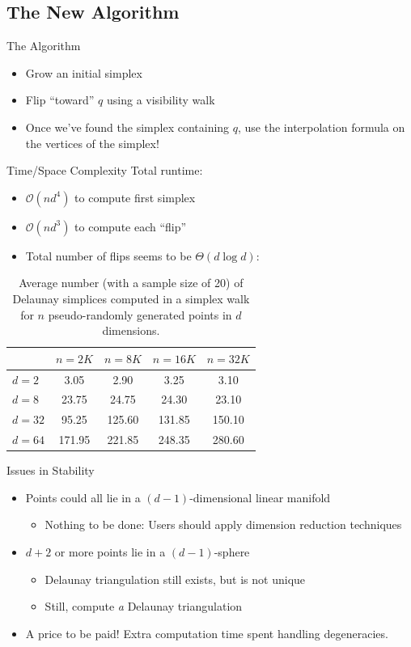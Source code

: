 \documentclass[xcolor=dvipsnames]{beamer}
\begin{document}
\subsection{The New Algorithm}
\begin{frame}{The Algorithm}
\begin{itemize}
\item Grow an initial simplex
\item Flip ``toward'' $q$ using a visibility walk
\item Once we've found the simplex containing $q$, use the interpolation 
formula on the vertices of the simplex!
\end{itemize}
\end{frame}
\begin{frame}{Time/Space Complexity}
Total runtime:
\begin{itemize}
\item $\mathcal{O}(nd^4)$ to compute first simplex
\item $\mathcal{O}(nd^3)$ to compute each ``flip''
\item Total number of flips seems to be $\Theta(d\log d)$:
\end{itemize}
\begin{table}[htb]
\caption{Average number (with a sample size of 20) of Delaunay simplices 
computed in a simplex walk for $n$ pseudo-randomly generated points in 
$d$ dimensions.}
\label{tab:walk}
\centering
\begin{tabular}{l|cccc}
  & $n=2K$ & $n=8K$ & $n=16K$ & $n=32K$\\
\hline
$d=2$  & 3.05 & 2.90 & 3.25 & 3.10\\
$d=8$  & 23.75 & 24.75 & 24.30 & 23.10\\
$d=32$ & 95.25 & 125.60 & 131.85 & 150.10\\
$d=64$ & 171.95 & 221.85 & 248.35 & 280.60\\
\end{tabular}
\end{table}
\end{frame}
\begin{frame}{Issues in Stability}
\begin{itemize}
\item Points could all lie in a $(d-1)$-dimensional linear manifold
\begin{itemize}
\item Nothing to be done: Users should apply dimension reduction techniques
\end{itemize}
\item $d+2$ or more points lie in a $(d-1)$-sphere
\begin{itemize}
\item Delaunay triangulation still exists, but is not unique
\item Still, compute {\it a} Delaunay triangulation
\end{itemize}
\item A price to be paid! Extra computation time spent handling degeneracies.
\end{itemize}
\end{frame}
\end{document}
